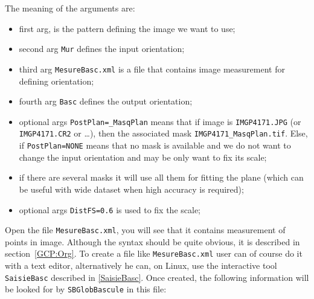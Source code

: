 The meaning of the arguments are:

\begin{itemize}
  \item first arg, is the pattern defining the image we want to use;

  \item second arg {\tt Mur} defines the input orientation;

  \item third arg {\tt MesureBasc.xml} is a file that contains image measurement
	for defining orientation;

  \item fourth  arg {\tt Basc} defines the output orientation;

  \item optional args {\tt PostPlan=\_MasqPlan}  means that if image is {\tt IMGP4171.JPG}
	(or {\tt IMGP4171.CR2} or \dots), then the associated mask {\tt IMGP4171\_MasqPlan.tif}. Else,
	if {\tt PostPlan=NONE} means that no mask is available and we do not want to change the input orientation and
	may be only want to fix its scale; 

   \item  if there are several masks it will use all them for
	 fitting the plane (which can be useful with wide dataset when high accuracy  is required);

  \item optional args {\tt DistFS=0.6} is used to fix the scale;
\end{itemize}


Open the file {\tt MesureBasc.xml}, you will see that it contains measurement
of points in image. Although the syntax should be quite obvious, it is
described in section~\ref{GCP:Org}. To create a file like {\tt MesureBasc.xml}
user can of course do it with a text editor, alternatively he can, on Linux,
use the interactive tool {\tt SaisieBasc}  described in \ref{SaisieBasc}.
Once created, the following information will be looked for by  {\tt SBGlobBascule}
in this file:

